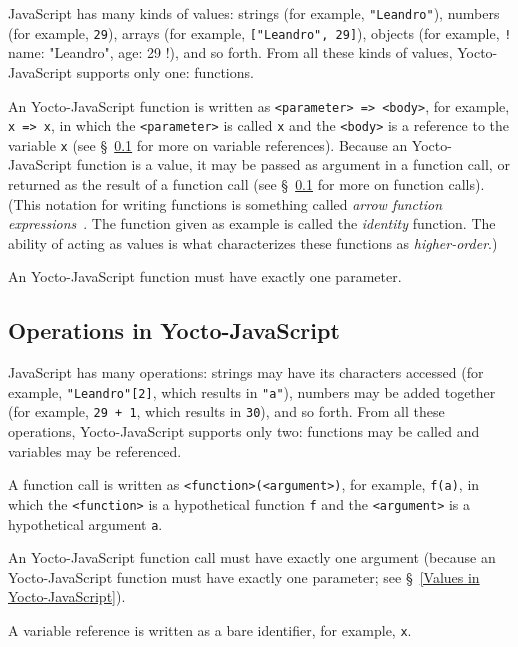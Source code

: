 \documentclass[12pt, oneside]{book}
\begin{document}
JavaScript has many kinds of values: strings (for example, \texttt{"Leandro"}), numbers (for example, \texttt{29}), arrays (for example, \texttt{["Leandro", 29]}), objects (for example, \texttt!{ name: "Leandro", age: 29 }!), and so forth. From all these kinds of values, Yocto-JavaScript supports only one: functions.

An Yocto-JavaScript function is written as \verb!<parameter> => <body>!, for example, \texttt{x => x}, in which the \verb!<parameter>! is called \texttt{x} and the \verb!<body>! is a reference to the variable \texttt{x} (see §~\ref{Operations in Yocto-JavaScript} for more on variable references). Because an Yocto-JavaScript function is a value, it may be passed as argument in a function call, or returned as the result of a function call (see §~\ref{Operations in Yocto-JavaScript} for more on function calls). (This notation for writing functions is something called \emph{arrow function expressions}~\cite{arrow-function-expressions}. The function given as example is called the \emph{identity} function. The ability of acting as values is what characterizes these functions as \emph{higher-order}.)

An Yocto-JavaScript function must have exactly one parameter.

\subsection{Operations in Yocto-JavaScript}
\label{Operations in Yocto-JavaScript}

JavaScript has many operations: strings may have its characters accessed (for example, \texttt{"Leandro"[2]}, which results in \texttt{"a"}), numbers may be added together (for example, \texttt{29 + 1}, which results in \texttt{30}), and so forth. From all these operations, Yocto-JavaScript supports only two: functions may be called and variables may be referenced.

A function call is written as \verb!<function>(<argument>)!, for example, \texttt{f(a)}, in which the \verb!<function>! is a hypothetical function \texttt{f} and the \verb!<argument>! is a hypothetical argument \texttt{a}.

An Yocto-JavaScript function call must have exactly one argument (because an Yocto-JavaScript function must have exactly one parameter; see §~\ref{Values in Yocto-JavaScript}).

A variable reference is written as a bare identifier, for example, \texttt{x}.
\end{document}
